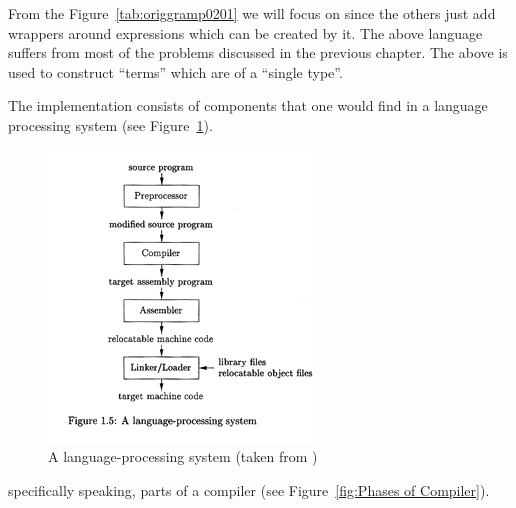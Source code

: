 \documentclass[thesis-solanki.tex]{subfiles}
\begin{document}
From the Figure~\ref{tab:origgramp0201} we will focus on   since the others just add wrappers around expressions which can
be created by it. The above language suffers from most of the problems discussed in the previous chapter. The above is used to construct
 ``terms'' which are of a ``single type''.


The implementation consists of components that one would find in a language processing system (see Figure~\ref{fig:A language-processing system}).

\begin{figure}[th]
\centering
\includegraphics[scale = .95]{Language_Processing_System.png}
\caption{A language-processing system (taken from \cite{Aho:1986:CPT:6448})}
\label{fig:A language-processing system}
\end{figure}

specifically speaking, parts of a compiler (see Figure~\ref{fig:Phases of Compiler}).
\end{document}
